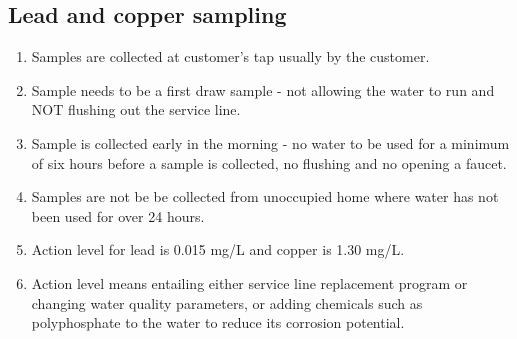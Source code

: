 \subsection{Lead and copper sampling}
\begin{enumerate}
\item Samples are collected at customer's tap usually by the customer.
\item Sample needs to be a first draw sample - not allowing the water to run and NOT flushing out the service line.
\item Sample is collected early in the morning - no water to be used for a minimum of six hours before a sample is collected, no flushing and no opening a faucet.
\item Samples are not be be collected from unoccupied home where water has not been used for over 24 hours.
\item Action level for lead is 0.015 mg/L and copper is 1.30 mg/L.  
\item Action level means entailing either service line replacement program or changing water quality parameters, or adding chemicals such as polyphosphate to the water to reduce its corrosion potential.
\end{enumerate}


